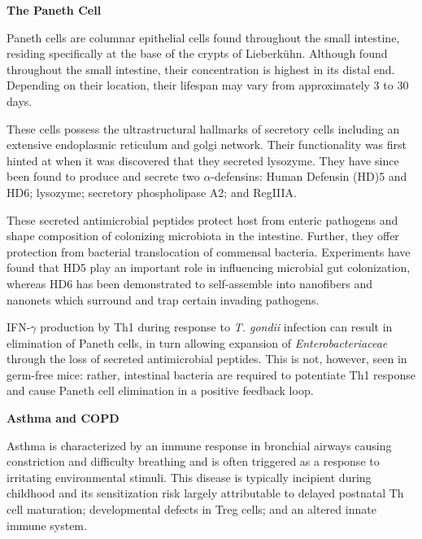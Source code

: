 \documentclass[11pt,letterpaper,final] {article}
\begin{document}

\begin{center}
	{\bfseries The Paneth Cell}
\end{center}

Paneth cells are columnar epithelial cells found throughout the small intestine, residing specifically at the base of the crypts of Lieberk\"{u}hn. Although found throughout the small intestine, their concentration is highest in its distal end. Depending on their location, their lifespan may vary from approximately 3 to 30 days.

These cells possess the ultrastructural hallmarks of secretory cells including an extensive endoplasmic reticulum and golgi network. Their functionality was first hinted at when it was discovered that they secreted lysozyme. They have since been found to produce and secrete two $\alpha$-defensins: Human Defensin (HD)5 and HD6; lysozyme; secretory phospholipase A2; and RegIIIA.

These secreted antimicrobial peptides protect host from enteric pathogens and shape composition of colonizing microbiota in the intestine. Further, they offer protection from bacterial translocation of commensal bacteria. Experiments have found that HD5 play an important role in influencing microbial gut colonization, whereas HD6 has been demonstrated to self-assemble into nanofibers and nanonets which surround and trap certain invading pathogens.

IFN-$\gamma$ production by Th1 during response to {\itshape T. gondii} infection can result in elimination of Paneth cells, in turn allowing expansion of {\itshape Enterobacteriaceae} through the loss of secreted antimicrobial peptides. This is not, however, seen in germ-free mice: rather, intestinal bacteria are required to potentiate Th1 response and cause Paneth cell elimination in a positive feedback loop.

\clearpage

\begin{center}
	{\bfseries Asthma and COPD}
\end{center}

Asthma is characterized by an immune response in bronchial airways causing constriction and difficulty breathing and is often triggered as a response to irritating environmental stimuli. This disease is typically incipient during childhood and its sensitization risk largely attributable to delayed postnatal Th cell maturation; developmental defects in Treg cells; and an altered innate immune system.
\end{document}
